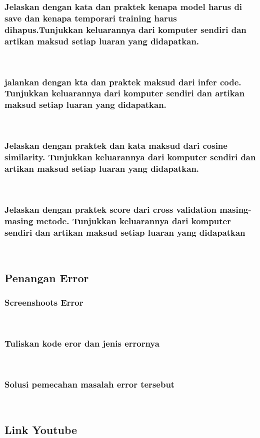 	\subsubsection{Jelaskan dengan kata dan praktek kenapa model harus di save dan kenapa
temporari training harus dihapus.Tunjukkan keluarannya dari komputer sendiri
dan artikan maksud setiap luaran yang didapatkan.
}\hfill\\
	
	\subsubsection{jalankan dengan kta dan praktek maksud dari infer code. Tunjukkan keluarannya dari komputer sendiri dan artikan maksud setiap luaran yang didapatkan.}\hfill\\
	
	\subsubsection{Jelaskan dengan praktek dan kata maksud dari cosine similarity. Tunjukkan
keluarannya dari komputer sendiri dan artikan maksud setiap luaran yang didapatkan.}\hfill\\

	\subsubsection{Jelaskan dengan praktek score dari cross validation masing-masing metode.
Tunjukkan keluarannya dari komputer sendiri dan artikan maksud setiap luaran yang didapatkan}\hfill\\
	
\subsection{Penangan Error}
	
	\subsubsection{Screenshoots Error}\hfill\\
	
	\subsubsection{Tuliskan kode eror dan jenis errornya}\hfill\\
	 
	\subsubsection{Solusi pemecahan masalah error tersebut}\hfill\\
	
	
\subsection{Link Youtube}
	
	\subsubsection{}\hfill\\

	